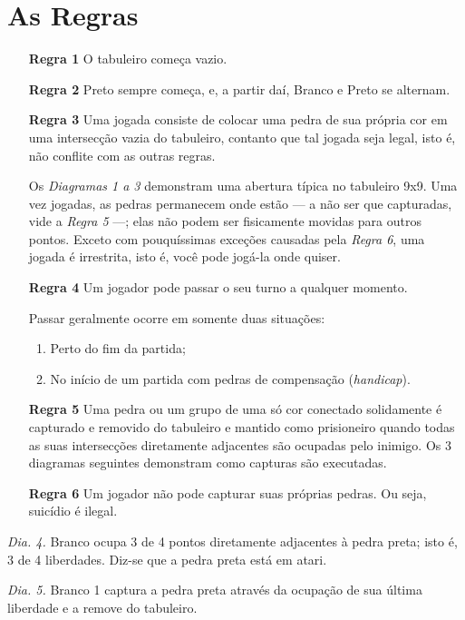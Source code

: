 \chapter{As Regras}

\begin{itemize}
    \item[\textbf{Regra 1}] O tabuleiro começa vazio.
    \item[\textbf{Regra 2}] Preto sempre começa, e, a partir daí, Branco e Preto se alternam. 
    \item[\textbf{Regra 3}] Uma jogada consiste de colocar uma pedra de sua própria cor em uma intersecção vazia do tabuleiro, contanto que tal jogada seja legal, isto é, não conflite com as outras regras.
        
    Os \emph{Diagramas 1 a 3} demonstram uma abertura típica no tabuleiro 9x9. Uma vez jogadas, as pedras permanecem onde estão --- a não ser que capturadas, vide a \emph{Regra 5} ---; elas não podem ser fisicamente movidas para outros pontos. Exceto com pouquíssimas exceções causadas pela \emph{Regra 6}, uma jogada é irrestrita, isto é, você pode jogá-la onde quiser.
    \item[\textbf{Regra 4}] Um jogador pode passar o seu turno a qualquer momento.
    
    Passar geralmente ocorre em somente duas situações:
        
    \begin{enumerate}
        \item Perto do fim da partida;
        \item No início de um partida com pedras de compensação (\emph{handicap}).
    \end{enumerate}
    \item[\textbf{Regra 5}] Uma pedra ou um grupo de uma só cor conectado solidamente é capturado e removido do tabuleiro e mantido como prisioneiro quando todas as suas intersecções diretamente adjacentes são ocupadas pelo inimigo. Os 3 diagramas seguintes demonstram como capturas são executadas.
    \item[\textbf{Regra 6}] Um jogador não pode capturar suas próprias pedras. Ou seja, suicídio é ilegal.
\end{itemize}

\emph{Dia. 4.} Branco ocupa 3 de 4 pontos diretamente adjacentes à pedra preta; isto é, 3 de 4 liberdades. Diz-se que a pedra preta está em atari.

\emph{Dia. 5.} Branco 1 captura a pedra preta através da ocupação de sua última liberdade e a remove do tabuleiro.

